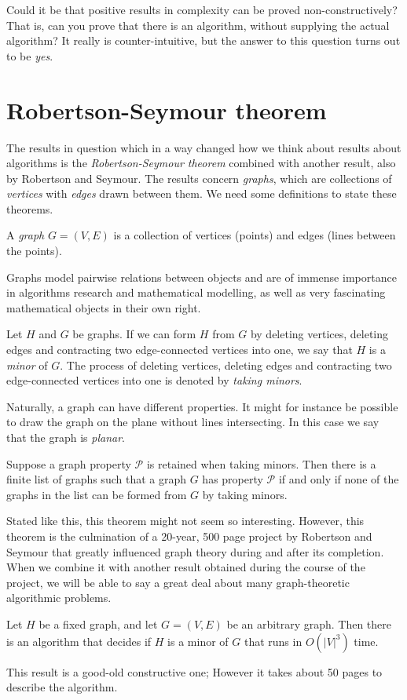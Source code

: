 Could it be that positive results in complexity can be proved non-constructively? That is, can you prove that there is an algorithm, without supplying the actual algorithm? It really is counter-intuitive, but the answer to this question turns out to be \emph{yes}. 

\section{Robertson-Seymour theorem}
The results in question which in a way changed how we think about results about algorithms is the \emph{Robertson-Seymour theorem} combined with another result, also by Robertson and Seymour. The results concern \emph{graphs}, which are collections of \emph{vertices} with \emph{edges} drawn between them. We need some definitions to state these theorems. 

\begin{definition}[Informal]
A \emph{graph} $G = (V,E)$ is a collection of vertices (points) and edges (lines between the points).
\end{definition}
Graphs model pairwise relations between objects and are of immense importance in algorithms research and mathematical modelling, as well as very fascinating mathematical objects in their own right.

\begin{definition}
Let $H$ and $G$ be graphs. If we can form $H$ from $G$ by deleting vertices, deleting edges and contracting two edge-connected vertices into one, we say that $H$ is a \emph{minor} of $G$. The process of deleting vertices, deleting edges and contracting two edge-connected vertices into one is denoted by \emph{taking minors}. 
\end{definition}

Naturally, a graph can have different properties. It might for instance be possible to draw the graph on the plane without lines intersecting. In this case we say that the graph is \emph{planar}.
\begin{theorem}
Suppose a graph property $\mathcal{P}$ is retained when taking minors. Then there is a finite list of graphs such that a graph $G$ has property $\mathcal{P}$ if and only if none of the graphs in the list can be formed from $G$ by taking minors.
\end{theorem}
Stated like this, this theorem might not seem so interesting. However, this theorem is the culmination of a 20-year, 500 page project by Robertson and Seymour that greatly influenced graph theory during and after its completion. When we combine it with another result obtained during the course of the project, we will be able to say a great deal about many graph-theoretic algorithmic problems. 
\begin{theorem}
Let $H$ be a fixed graph, and let $G= (V, E)$ be an arbitrary graph. Then there is an algorithm that decides if $H$ is a minor of $G$ that runs in $O(\lvert V\rvert^3)$ time.
\end{theorem}
This result is a good-old constructive one; However it takes about 50 pages to describe the algorithm. 


